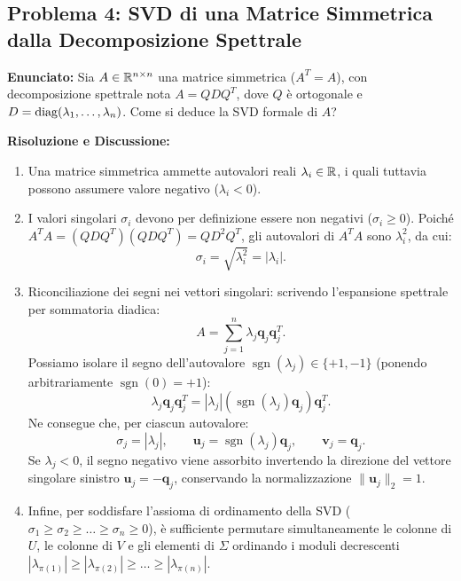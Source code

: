 \subsection{Problema 4: SVD di una Matrice Simmetrica dalla Decomposizione Spettrale}
\label{sec:svd-simmetrica-spettrale}

\begin{example}[Ricavo della SVD da Decomposizione Spettrale $A = Q D Q^T$]
\textbf{Enunciato:} Sia $A \in \mathbb{R}^{n \times n}$ una matrice simmetrica ($A^T = A$), con decomposizione spettrale nota $A = Q D Q^T$, dove $Q$ \`e ortogonale e $D = \operatorname{diag}(\lambda_1, \dots, \lambda_n)$. Come si deduce la SVD formale di $A$?

\medskip
\textbf{Risoluzione e Discussione:}
\begin{enumerate}
    \item Una matrice simmetrica ammette autovalori reali $\lambda_i \in \mathbb{R}$, i quali tuttavia possono assumere valore negativo ($\lambda_i < 0$).
    \item I valori singolari $\sigma_i$ devono per definizione essere non negativi ($\sigma_i \ge 0$). Poich\'e $A^T A = (Q D Q^T)(Q D Q^T) = Q D^2 Q^T$, gli autovalori di $A^T A$ sono $\lambda_i^2$, da cui:
    \begin{equation}
        \sigma_i = \sqrt{\lambda_i^2} = |\lambda_i|.
    \end{equation}
    \item Riconciliazione dei segni nei vettori singolari: scrivendo l'espansione spettrale per sommatoria diadica:
    \begin{equation}
        A = \sum_{j=1}^n \lambda_j \mathbf{q}_j \mathbf{q}_j^T.
    \end{equation}
    Possiamo isolare il segno dell'autovalore $\operatorname{sgn}(\lambda_j) \in \{+1, -1\}$ (ponendo arbitrariamente $\operatorname{sgn}(0) = +1$):
    \begin{equation}
        \lambda_j \mathbf{q}_j \mathbf{q}_j^T = |\lambda_j| \left( \operatorname{sgn}(\lambda_j) \mathbf{q}_j \right) \mathbf{q}_j^T.
    \end{equation}
    Ne consegue che, per ciascun autovalore:
    \begin{equation}
        \sigma_j = |\lambda_j|, \qquad \mathbf{u}_j = \operatorname{sgn}(\lambda_j) \mathbf{q}_j, \qquad \mathbf{v}_j = \mathbf{q}_j.
    \end{equation}
    Se $\lambda_j < 0$, il segno negativo viene assorbito invertendo la direzione del vettore singolare sinistro $\mathbf{u}_j = -\mathbf{q}_j$, conservando la normalizzazione $\|\mathbf{u}_j\|_2 = 1$.
    \item Infine, per soddisfare l'assioma di ordinamento della SVD ($\sigma_1 \ge \sigma_2 \ge \dots \ge \sigma_n \ge 0$), \`e sufficiente permutare simultaneamente le colonne di $U$, le colonne di $V$ e gli elementi di $\Sigma$ ordinando i moduli decrescenti $|\lambda_{\pi(1)}| \ge |\lambda_{\pi(2)}| \ge \dots \ge |\lambda_{\pi(n)}|$.
\end{enumerate}
\end{example}

